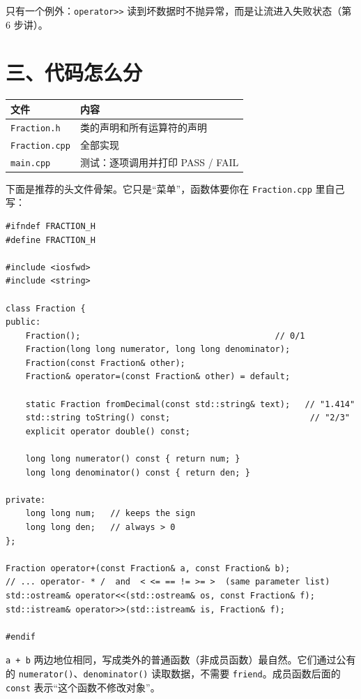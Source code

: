 \documentclass[11pt,a4paper]{article}
\newcommand{\code}[1]{\texttt{#1}}
\begin{document}
只有一个例外：\code{operator>>} 读到坏数据时不抛异常，而是让流进入失败状态（第 6 步讲）。

\section{三、代码怎么分}

\begin{center}
\small
\begin{tabular}{@{}ll@{}}
\toprule
文件 & 内容 \\
\midrule
\code{Fraction.h} & 类的声明和所有运算符的声明 \\
\code{Fraction.cpp} & 全部实现 \\
\code{main.cpp} & 测试：逐项调用并打印 PASS / FAIL \\
\bottomrule
\end{tabular}
\end{center}

下面是推荐的头文件骨架。它只是“菜单”，函数体要你在 \code{Fraction.cpp} 里自己写：

\begin{lstlisting}
#ifndef FRACTION_H
#define FRACTION_H

#include <iosfwd>
#include <string>

class Fraction {
public:
    Fraction();                                       // 0/1
    Fraction(long long numerator, long long denominator);
    Fraction(const Fraction& other);
    Fraction& operator=(const Fraction& other) = default;

    static Fraction fromDecimal(const std::string& text);   // "1.414"
    std::string toString() const;                            // "2/3"
    explicit operator double() const;

    long long numerator() const { return num; }
    long long denominator() const { return den; }

private:
    long long num;   // keeps the sign
    long long den;   // always > 0
};

Fraction operator+(const Fraction& a, const Fraction& b);
// ... operator- * /  and  < <= == != >= >  (same parameter list)
std::ostream& operator<<(std::ostream& os, const Fraction& f);
std::istream& operator>>(std::istream& is, Fraction& f);

#endif
\end{lstlisting}

\begin{tip}[为什么运算符写在类外面]
\code{a + b} 两边地位相同，写成类外的普通函数（非成员函数）最自然。它们通过公有的 \code{numerator()}、\code{denominator()} 读取数据，不需要 \code{friend}。成员函数后面的 \code{const} 表示“这个函数不修改对象”。
\end{tip}
\end{document}
